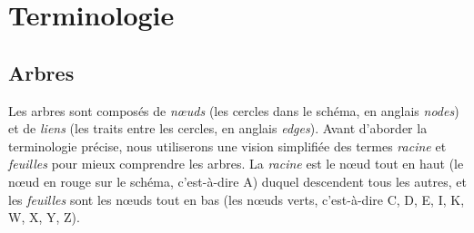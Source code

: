 \documentclass[11pt,a4paper]{article}
\begin{document}
\begin{center}


\end{center}

\smallskip


\section{Terminologie}

\subsection{Arbres}

Les arbres sont composés de \textit{nœuds} (les cercles dans le schéma, en anglais \textit{nodes}) et de \textit{liens} (les traits entre les cercles, en anglais \textit{edges}).
Avant d'aborder la terminologie précise, nous utiliserons une vision simplifiée des termes \textit{racine} et \textit{feuilles} pour mieux comprendre les arbres.
La \textit{racine} est le nœud tout en haut (le nœud en rouge sur le schéma, c'est-à-dire A) duquel descendent tous les autres, et les \textit{feuilles} sont les nœuds tout en bas (les nœuds verts, c'est-à-dire C, D, E, I, K, W, X, Y, Z).

\bigskip
\end{document}
